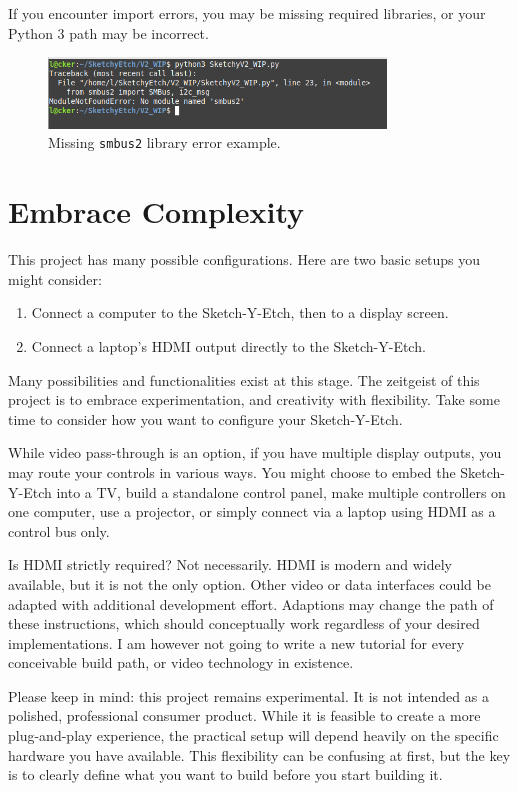 \documentclass[]{article}
\begin{document}
If you encounter import errors, you may be missing required libraries, or your Python 3 path may be incorrect.

\begin{figure}[ht]
	\centering
	\includegraphics[width=0.8\textwidth]{missing.png}
	\caption{Missing \texttt{smbus2} library error example.}
	\label{fig:missing_smbus2}
\end{figure}

\section*{Embrace Complexity}

This project has many possible configurations. Here are two basic setups you might consider:

\begin{enumerate}
	\item Connect a computer to the Sketch-Y-Etch, then to a display screen.
	\item Connect a laptop's HDMI output directly to the Sketch-Y-Etch.
\end{enumerate}

Many possibilities and functionalities exist at this stage. The zeitgeist of this project is to embrace experimentation, and creativity with flexibility. Take some time to consider how you want to configure your Sketch-Y-Etch.

While video pass-through is an option, if you have multiple display outputs, you may route your controls in various ways. You might choose to embed the Sketch-Y-Etch into a TV, build a standalone control panel, make multiple controllers on one computer, use a projector, or simply connect via a laptop using HDMI as a control bus only.

Is HDMI strictly required? Not necessarily. HDMI is modern and widely available, but it is not the only option. Other video or data interfaces could be adapted with additional development effort. Adaptions may change the path of these instructions, which should conceptually work regardless of your desired implementations. I am however not going to write a new tutorial for every conceivable build path, or video technology in existence. 

Please keep in mind: this project remains experimental. It is not intended as a polished, professional consumer product.  
While it is feasible to create a more plug-and-play experience, the practical setup will depend heavily on the specific hardware you have available.
This flexibility can be confusing at first, but the key is to clearly define what you want to build before you start building it.
\end{document}
